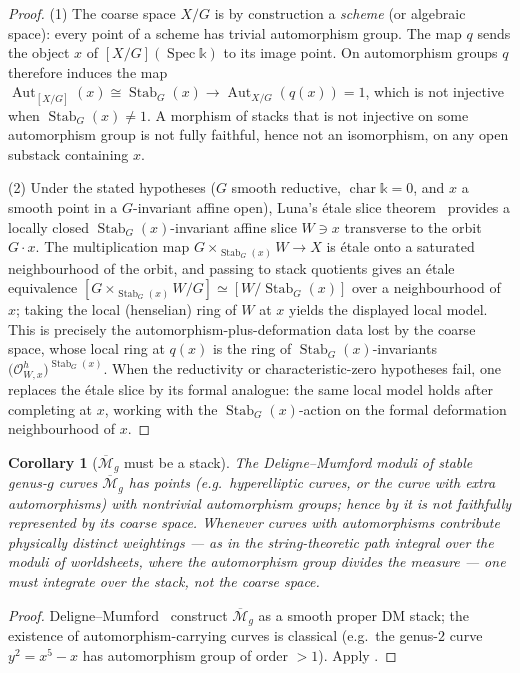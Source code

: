 \documentclass[12pt]{article}
\newtheorem{corollary}[theorem]{Corollary}
\theoremstyle{definition}
\theoremstyle{remark}
\newcommand{\Spec}{\operatorname{Spec}}
\newcommand{\Stab}{\operatorname{Stab}}
\newcommand{\Aut}{\operatorname{Aut}}
\newcommand{\Ohm}{\mathcal{O}}
\newcommand{\coeff}{\mathbb{k}}
\begin{document}
\begin{proof}
(1) The coarse space $X/G$ is by construction a \emph{scheme} (or algebraic space): every point of a
scheme has trivial automorphism group. The map $q$ sends the object $x$ of $[X/G](\Spec\coeff)$ to its
image point. On automorphism groups $q$ therefore induces the map
$\Aut_{[X/G]}(x)\cong\Stab_G(x)\to \Aut_{X/G}(q(x))=1$, which is not injective when $\Stab_G(x)\neq 1$.
A morphism of stacks that is not injective on some automorphism group is not fully faithful, hence not an
isomorphism, on any open substack containing $x$.

(2) Under the stated hypotheses ($G$ smooth reductive, $\operatorname{char}\coeff=0$, and $x$ a smooth
point in a $G$-invariant affine open), Luna's \'etale slice theorem~\cite{luna} provides a locally
closed $\Stab_G(x)$-invariant affine slice $W\ni x$ transverse to the orbit $G\cdot x$. The
multiplication map $G\times_{\Stab_G(x)} W \to X$ is \'etale onto a saturated neighbourhood of the
orbit, and passing to stack quotients gives an \'etale equivalence
$[G\times_{\Stab_G(x)} W / G]\simeq [W/\Stab_G(x)]$ over a neighbourhood of $x$; taking the local
(henselian) ring of $W$ at $x$ yields the displayed local model. This is precisely the
automorphism-plus-deformation data lost by the coarse space, whose local ring at $q(x)$ is the ring of
$\Stab_G(x)$-invariants $\bigl(\Ohm^h_{W,x}\bigr)^{\Stab_G(x)}$. When the reductivity or
characteristic-zero hypotheses fail, one replaces the \'etale slice by its formal analogue: the same
local model holds after completing at $x$, working with the $\Stab_G(x)$-action on the formal
deformation neighbourhood of $x$.
\end{proof}

\begin{corollary}[$\overline{\mathcal M}_g$ must be a stack]
\label{cor:mgbar}
The Deligne--Mumford moduli of stable genus-$g$ curves $\overline{\mathcal M}_g$ has points (e.g.\
hyperelliptic curves, or the curve with extra automorphisms) with nontrivial automorphism groups; hence
by \Cref{thm:stack} it is not faithfully represented by its coarse space. Whenever curves with
automorphisms contribute physically distinct weightings --- as in the string-theoretic path integral
over the moduli of worldsheets, where the automorphism group divides the measure --- one must integrate
over the \emph{stack}, not the coarse space.
\end{corollary}
\begin{proof}
Deligne--Mumford~\cite{delignemumford} construct $\overline{\mathcal M}_g$ as a smooth proper DM stack;
the existence of automorphism-carrying curves is classical (e.g.\ the genus-$2$ curve $y^2=x^5-x$ has
automorphism group of order $>1$). Apply \Cref{thm:stack}.
\end{proof}
\end{document}
